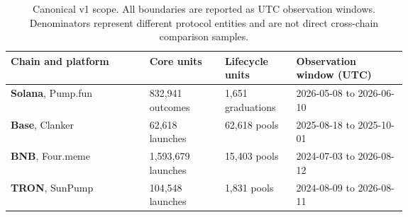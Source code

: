 \begin{table}[t]
  \centering
  \caption{Canonical v1 scope. All boundaries are reported as UTC observation windows. Denominators represent different protocol entities and are not direct cross-chain comparison samples.}
  \label{tab:data-scope}
  \small
  \setlength{\tabcolsep}{4.5pt}
  \renewcommand{\arraystretch}{1.10}
  \begin{tabularx}{\linewidth}{@{}>{\raggedright\arraybackslash}X R{0.19\linewidth} R{0.18\linewidth} C{0.28\linewidth}@{}}
    \toprule
    \textbf{Chain and platform} & \textbf{Core units} & \textbf{Lifecycle units} & \textbf{Observation window (UTC)} \\
    \midrule
    \textbf{Solana}, Pump.fun & 832,941 outcomes & 1,651 graduations & 2026-05-08 to 2026-06-10 \\
    \textbf{Base}, Clanker & 62,618 launches & 62,618 pools & 2025-08-18 to 2025-10-01 \\
    \textbf{BNB}, Four.meme & 1,593,679 launches & 15,403 pools & 2024-07-03 to 2026-08-12 \\
    \textbf{TRON}, SunPump & 104,548 launches & 1,831 pools & 2024-08-09 to 2026-08-11 \\
    \bottomrule
  \end{tabularx}
\end{table}
